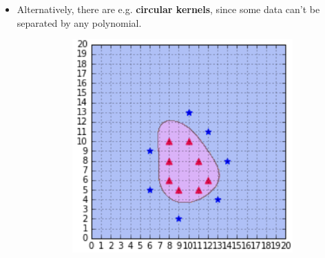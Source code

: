 \begin{itemize}
\begin{figure}[ht]
\begin{subfigure}{0.21\textwidth}
    \end{subfigure}
  \end{figure}
  \item Alternatively, there are e.g. \textbf{circular kernels}, since some data can't be separated by any polynomial.
  \begin{figure}[ht]
    \centering
    \begin{subfigure}{0.2\textwidth}
      \centering
      \includegraphics[width=1\textwidth]{assets/svm/kernel__circular.png}
    \end{subfigure}
  \end{figure}
\end{itemize}

